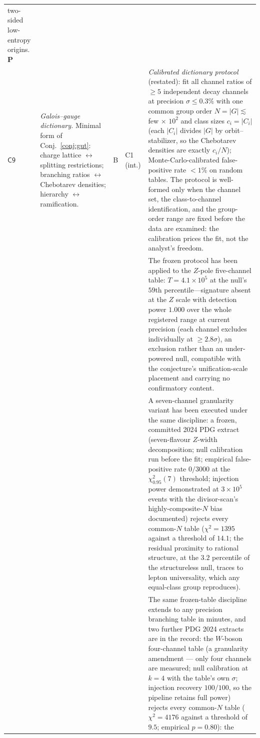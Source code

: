 \documentclass[11pt,a4paper]{article}
\theoremstyle{plain}
\theoremstyle{definition}
\theoremstyle{remark}
\begin{document}
\begin{longtable}{@{}p{}p{}p{}p{}p{}@{}}
two-sided low-entropy origins. \textbf{P}\\
$\mathsf{C9}$ &
\emph{Galois--gauge dictionary.} Minimal form of Conj.~\ref{conj:gut}: charge lattice
$\leftrightarrow$ splitting restrictions; branching ratios $\leftrightarrow$ Chebotarev
densities; hierarchy $\leftrightarrow$ ramification. &
B &
C1 (int.) &
\emph{Calibrated dictionary protocol} (restated): fit all channel ratios of $\geq5$
independent decay channels at precision $\sigma\leq0.3\%$ with one common group order
$N=|G|\lesssim$ few$\,\times\,10^{2}$ and class sizes $c_{i}=|C_{i}|$ (each $|C_{i}|$ divides
$|G|$ by orbit--stabilizer, so the Chebotarev densities are exactly $c_{i}/N$);
Monte-Carlo-calibrated false-positive rate $<1\%$ on random tables. The protocol is
well-formed only when the channel set, the class-to-channel identification, and the
group-order range are fixed before the data are examined: the calibration prices the fit,
not the analyst's freedom.\\
 & & & & The frozen protocol has been applied to the $Z$-pole
five-channel table: $T=4.1\times10^{5}$ at the null's $59$th percentile---signature absent
at the $Z$ scale with detection power $1.000$ over the whole registered range at current
precision (each channel excludes individually at $\geq2.8\sigma$), an exclusion rather than
an under-powered null, compatible with the conjecture's unification-scale placement and
carrying no confirmatory content.\\
 & & & & A seven-channel granularity variant has been executed
under the same discipline: a frozen, committed 2024 PDG extract (seven-flavour $Z$-width
decomposition; null calibration run before the fit; empirical false-positive rate
$0/3000$ at the $\chi^{2}_{0.95}(7)$ threshold; injection power demonstrated at
$3\times10^{5}$ events with the divisor-scan's highly-composite-$N$ bias documented)
rejects every common-$N$ table ($\chi^{2}=1395$ against a threshold of $14.1$; the residual
proximity to rational structure, at the $3.2$ percentile of the structureless null, traces
to lepton universality, which any equal-class group reproduces).\\
 & & & & The same frozen-table
discipline extends to any precision branching table in minutes, and two further PDG 2024
extracts are in the record: the $W$-boson four-channel table (a granularity amendment
--- only four channels are measured; null calibration at $k=4$ with the table's own
$\sigma$; injection recovery $100/100$, so the pipeline retains full power) rejects every
common-$N$ table ($\chi^{2}=4176$ against a threshold of $9.5$; empirical $p=0.80$): the

\end{longtable}
\end{document}
